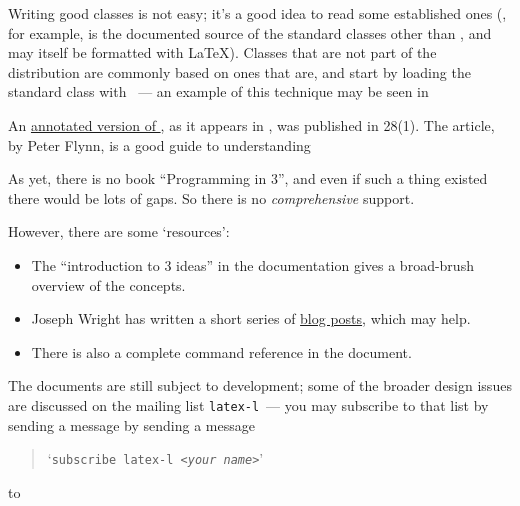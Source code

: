 Writing good classes is not easy; it's a good idea to read some
established ones (, for example, is the documented
source of the standard classes other than , and may
itself be formatted with \LaTeX{}).  Classes that are not part of the
distribution are commonly based on ones that are, and start by loading
the standard class with ~--- an example of this
technique may be seen in 

An %
\href{http://tug.org/TUGboat/Articles/tb28-1/tb88flynn.pdf}{annotated version of },
as it appears in , was published in
\TUGboat{} 28(1).  The article, by Peter Flynn, is a good guide to
understanding 
\begin{ctanrefs}
\item[classes.dtx]
\item[clsguide.pdf]
\item[latex-tds \nothtml{rmfamily}collection]
\item[ltxguide.cls]
\item[\nothtml{\rmfamily}\LaTeX{} documentation]
\item[source2e.tex]
\end{ctanrefs}

As yet, there is no book ``Programming in \latex{}3'', and even if
such a thing existed there would be lots of gaps.  So there is no
\emph{comprehensive} support.

However, there are some `resources':
\begin{itemize}
\item The ``introduction to \latex{}3 ideas'' in the 
  documentation gives a broad-brush overview of the concepts.
\item Joseph Wright has written a short series of %
  \href{http://www.texdev.net/index.php?s=programming+latex3}{blog posts},
  which may help.
\item There is also a complete command reference in the
   document.
\end{itemize}

The documents are still subject to development; some of the broader
design issues are discussed on the \latex{} mailing list
\texttt{latex-l}~--- you may subscribe to that list by sending a
message by sending a message
\begin{quote}
  `\texttt{subscribe latex-l <\emph{your name}>}'
\end{quote}
to 
\begin{ctanrefs}
\item[expl3.pdf]
\item[interface3.pdf]
\end{ctanrefs}

